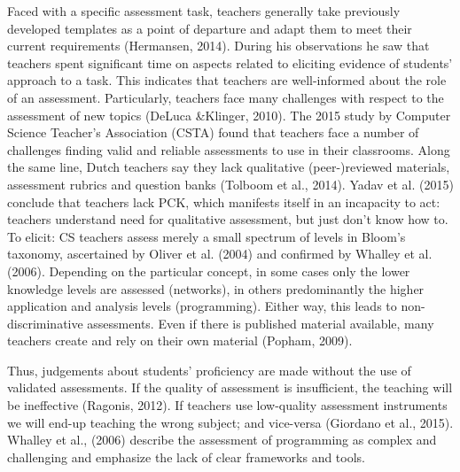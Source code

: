 
Faced with a specific assessment task, teachers generally take previously developed templates as a point of departure and adapt them to meet their current requirements (Hermansen, 2014). During his observations he saw that teachers spent significant time on aspects related to eliciting evidence of students' approach to a task. This indicates that teachers are well-informed about the role of an assessment.
Particularly, teachers face many challenges with respect to the assessment of new topics (DeLuca \&Klinger, 2010). The 2015 study by Computer Science Teacher's Association (CSTA) found that teachers face a number of challenges finding valid and reliable assessments to use in their classrooms. Along the same line, Dutch teachers say they lack qualitative (peer-)reviewed materials, assessment rubrics and question banks (Tolboom et al., 2014). Yadav et al. (2015) conclude that teachers lack PCK, which manifests itself in an incapacity to act: teachers understand need for qualitative assessment, but just don't know how to. To elicit: CS teachers assess merely a small spectrum of levels in Bloom's taxonomy, ascertained by Oliver et al. (2004) and confirmed by Whalley et al. (2006). Depending on the particular concept, in some cases only the lower knowledge levels are assessed (networks), in others predominantly the higher application and analysis levels (programming). Either way, this leads to non-discriminative assessments. Even if there is published material available, many teachers create and rely on their own material (Popham, 2009).

Thus, judgements about students' proficiency are made without the use of validated assessments. If the quality of assessment is insufficient, the teaching will be ineffective (Ragonis, 2012).  If teachers use low-quality assessment instruments we will end-up teaching the wrong subject; and vice-versa (Giordano et al., 2015).  Whalley et al., (2006) describe the assessment of programming as complex and challenging and emphasize the lack of clear frameworks and tools.





